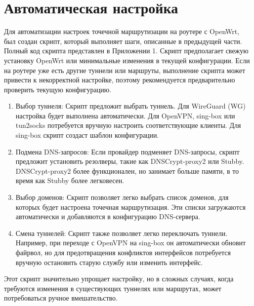 \section{Автоматическая настройка}

Для автоматизации настроек точечной маршрутизации на роутере с OpenWrt, был создан скрипт, который выполняет шаги, описанные в предыдущей части. Полный код скрипта представлен в Приложении 1. Скрипт предполагает свежую установку OpenWrt или минимальные изменения в текущей конфигурации. Если на роутере уже есть другие туннели или маршруты, выполнение скрипта может привести к некорректной настройке, поэтому рекомендуется предварительно проверить текущую конфигурацию.

\begin{enumerate}
    \item Выбор туннеля: Скрипт предложит выбрать туннель. Для WireGuard (WG) настройка будет выполнена автоматически. Для OpenVPN, sing-box или tun2socks потребуется вручную настроить соответствующие клиенты. Для sing-box скрипт создаст шаблон конфигурации.
    \item Подмена DNS-запросов: Если провайдер подменяет DNS-запросы, скрипт предложит установить резолверы, такие как DNSCrypt-proxy2 или Stubby. DNSCrypt-proxy2 более функционален, но занимает больше памяти, в то время как Stubby более легковесен.
    \item Выбор доменов: Скрипт позволяет легко выбрать список доменов, для которых будет настроена точечная маршрутизация. Эти списки загружаются автоматически и добавляются в конфигурацию DNS-сервера.
    \item Смена туннелей: Скрипт также позволяет легко переключать туннели. Например, при переходе с OpenVPN на sing-box он автоматически обновит файрвол, но для предотвращения конфликтов интерфейсов потребуется вручную остановить старую службу или изменить интерфейс.
\end{enumerate}

Этот скрипт значительно упрощает настройку, но в сложных случаях, когда требуются изменения в существующих туннелях или маршрутах, может потребоваться ручное вмешательство.

